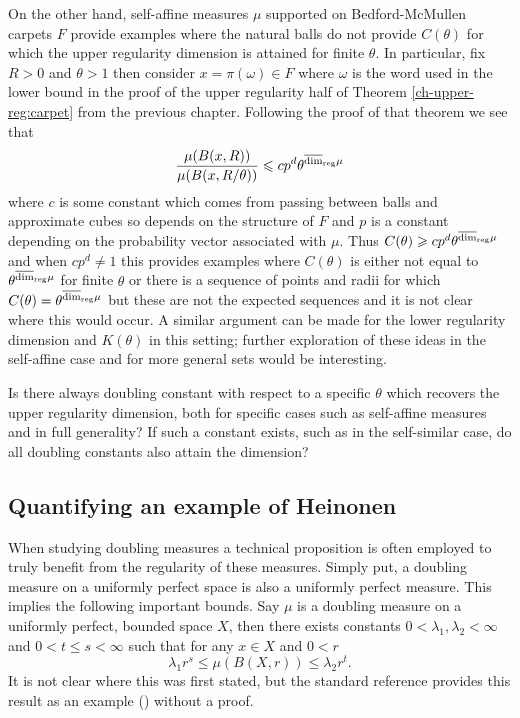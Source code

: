 On the other hand, self-affine measures $\mu$ supported on Bedford-McMullen carpets $F$ provide examples where the natural balls do not provide $C(\theta)$ for which the upper regularity dimension is attained for finite $\theta$. In particular, fix $R> 0$ and $\theta > 1$ then consider $x =\pi(\omega) \in F$ where $\omega$ is the word used in the lower bound in the proof of the upper regularity half of Theorem \ref{ch-upper-reg:carpet} from the previous chapter. Following the proof of that theorem we see that
\[
\frac{\mu(B(x,R))}{\mu(B(x,R/\theta))} \leqslant c p^d \theta^{\overline{\dim}_{\textup{reg}} \mu}
\]
where $c$ is some constant which comes from passing between balls and approximate cubes so depends on the structure of $F$ and $p$ is a constant depending on the probability vector associated with $\mu$. Thus $C(\theta) \geqslant cp^d \theta^{\overline{\dim}_{\textup{reg}} \mu}$ and when $cp^d \neq 1$ this provides examples where $C(\theta)$ is either not equal to $\theta^{\overline{\dim}_{\textup{reg}} \mu}$ for finite $\theta$ or there is a sequence of points and radii for which $C(\theta) = \theta^{\overline{\dim}_{\textup{reg}} \mu}$ but these are not the expected sequences and it is not clear where this would occur. A similar argument can be made for the lower regularity dimension and $K(\theta)$ in this setting; further exploration of these ideas in the self-affine case and for more general sets would be interesting.

\begin{question}
Is there always doubling constant with respect to a specific $\theta$ which recovers the upper regularity dimension, both for specific cases such as self-affine measures and in full generality? If such a constant exists, such as in the self-similar case, do all doubling constants also attain the dimension?
\end{question}


\subsection{Quantifying an example of Heinonen}\label{ch-quantifying:sec:quantifying}


When studying doubling measures a technical proposition is often employed to truly benefit from the regularity of these measures. Simply put, a doubling measure on a uniformly perfect space is also a uniformly perfect measure. This implies the following important bounds. Say $\mu$ is a doubling measure on a uniformly perfect, bounded space $X$, then there exists constants $0< \lambda_1, \lambda_2 < \infty$ and $0 < t \le s < \infty$ such that for any $x \in X$ and $0 < r$
\[
\lambda_1 r^s \le \mu(B(X,r)) \le \lambda_2 r^t.
\]
It is not clear where this was first stated, but the standard reference \cite{heinonen} provides this result as an example (\cite[Exercise 13.1]{heinonen}) without a proof. 


